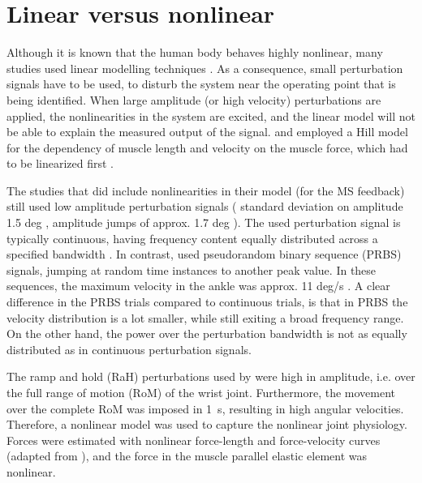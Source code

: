 \section{Linear versus nonlinear}
Although it is known that the human body behaves highly nonlinear, many studies used linear modelling techniques \cite{van_der_helm_identification_2002, schouten_nmclab_2008, mugge_rigorous_2010}. As a consequence, small perturbation signals have to be used, to disturb the system near the operating point that is being identified. When large amplitude (or high velocity) perturbations are applied, the nonlinearities in the system are excited, and the linear model will not be able to explain the measured output of the signal. \citeauthor{schouten_nmclab_2008} and \citeauthor{mugge_rigorous_2010} employed a Hill model for the dependency of muscle length and velocity on the muscle force, which had to be linearized first \cite{schouten_nmclab_2008, mugge_rigorous_2010}.

The studies that did include nonlinearities in their model (for the MS feedback) still used low amplitude perturbation signals (\citeauthor{zhang_simultaneous_1997} standard deviation on amplitude 1.5 deg \cite{zhang_simultaneous_1997}, \citeauthor{mirbagheri_intrinsic_2000} amplitude jumps of approx. 1.7 deg \cite{mirbagheri_intrinsic_2000}). The used perturbation signal is typically continuous, having frequency content equally distributed across a specified bandwidth \cite{zhang_simultaneous_1997, van_der_helm_identification_2002, schouten_nmclab_2008, mugge_sensory_2009}. In contrast, \citeauthor{mirbagheri_intrinsic_2000} used pseudorandom binary sequence (PRBS) signals, jumping at random time instances to another peak value. In these sequences, the maximum velocity in the ankle was approx. 11 deg/s \cite{mirbagheri_intrinsic_2000}. A clear difference in the PRBS trials compared to continuous trials, is that in PRBS the velocity distribution is a lot smaller, while still exiting a broad frequency range. On the other hand, the power over the perturbation bandwidth is not as equally distributed as in continuous perturbation signals. 

The ramp and hold (RaH) perturbations used by \citeauthor{de_gooijer-van_de_groep_estimation_2016} were high in amplitude, i.e. over the full range of motion (RoM) of the wrist joint. Furthermore, the movement over the complete RoM was imposed in \SI{1}{\second}, resulting in high angular velocities. Therefore, a nonlinear model was used to capture the nonlinear joint physiology. Forces were estimated with nonlinear force-length and force-velocity curves (adapted from \cite{thelen_adjustment_2003}), and the force in the muscle parallel elastic element was nonlinear. 



